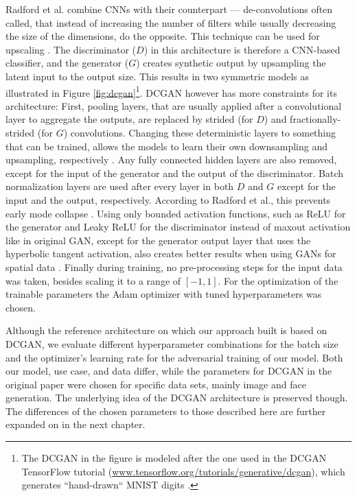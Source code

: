 Radford et al. combine CNNs with their counterpart --- de-convolutions often called, that instead of increasing the number of filters while usually decreasing the size of the dimensions, do the opposite. This technique can be used for upscaling \cite{zeiler2010deconvolutional}. The discriminator ($D$) in this architecture is therefore a CNN-based classifier, and the generator ($G$) creates synthetic output by upsampling the latent input to the output size. This results in two symmetric models as illustrated in Figure \ref{fig:dcgan}\footnote{The DCGAN in the figure is modeled after the one used in the DCGAN TensorFlow tutorial (\url{www.tensorflow.org/tutorials/generative/dcgan}), which generates ``hand-drawn`` MNIST digits \cite{lecun2010mnist}.}. DCGAN however has more constraints for its architecture: First, pooling layers, that are usually applied after a convolutional layer to aggregate the outputs, are replaced by strided (for $D$) and fractionally-strided (for $G$) convolutions. Changing these deterministic layers to something that can be trained, allows the models to learn their own downsampling and upsampling, respectively \cite{springenberg2014striving}. Any fully connected hidden layers are also removed, except for the input of the generator and the output of the discriminator. Batch normalization layers \cite{ioffe2015batch} are used after every layer in both $D$ and $G$ except for the input and the output, respectively. According to Radford et al., this prevents early mode collapse \cite{radford2015unsupervised}. Using only bounded activation functions, such as ReLU \cite{nair2010rectified} for the generator and Leaky ReLU \cite{maas2013rectifier} for the discriminator instead of maxout activation like in original GAN, except for the generator output layer that uses the hyperbolic tangent activation, also creates better results when using GANs for spatial data \cite{radford2015unsupervised}. Finally during training, no pre-processing steps for the input data was taken, besides scaling it to a range of $[-1,1]$. For the optimization of the trainable parameters the Adam optimizer \cite{kingma2014adam} with tuned hyperparameters was chosen.

Although the reference architecture on which our approach built is based on DCGAN, we evaluate different hyperparameter combinations for the batch size and the optimizer's learning rate for the adversarial training of our model. Both our model, use case, and data differ, while the parameters for DCGAN in the original paper were chosen for specific data sets, mainly image and face generation. The underlying idea of the DCGAN architecture is preserved though. The differences of the chosen parameters to those described here are further expanded on in the next chapter.



